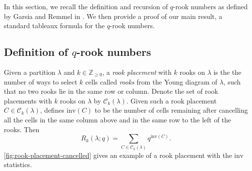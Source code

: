 \documentclass[12pt,reqno]{amsart}
\theoremstyle{plain}
\theoremstyle{definition}
\theoremstyle{remark}
\theoremstyle{example}
\numberwithin{equation}{section}
\newcommand\ZZ{\mathbb{Z}}
\newcommand\inv{\mathrm{inv}}
\begin{document}
In this section, we recall the definition and recursion of $q$-rook numbers as defined by Garsia and Remmel in \cite{Garsia_Remmel_rook}. We then provide a proof of our main result, a standard tableaux formula for the $q$-rook numbers.

\subsection{Definition of $q$-rook numbers}Given a partition $\lambda$ and $k \in \ZZ_{\geq 0}$, a \textit{rook placement} with $k$ rooks on $\lambda$ is the the number of ways to select $k$ cells called \textit{rooks} from the Young diagram of $\lambda$, such that no two rooks lie in the same row or column. Denote the set of rook placements with $k$ rooks on $\lambda$ by $\mathcal{C}_k(\lambda)$. Given such a rook placement $C \in \mathcal{C}_k(\lambda)$, \cite{Garsia_Remmel_rook} defines $\inv(C)$ to be the number of cells remaining after cancelling all the cells in the same column above and in the same row to the left of the rooks. Then \begin{equation}
	R_k(\lambda;q) = \sum_{C \in \mathcal{C}_k(\lambda)} q^{\inv(C)}.
\end{equation} \autoref{fig:rook-placement-cancelled} gives an example of a rook placement with the $\inv$ statistics.
\end{document}
